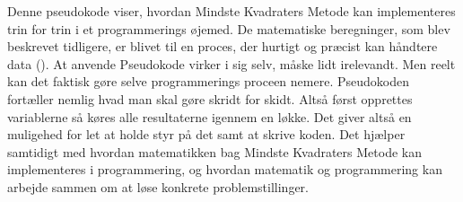 Denne pseudokode viser, hvordan Mindste Kvadraters Metode kan implementeres trin for trin i et programmerings øjemed. De matematiske beregninger, som blev beskrevet tidligere, er blivet til en proces, der hurtigt og præcist kan håndtere data (\cite{codesansar}). At anvende Pseudokode virker i sig selv, måske lidt irelevandt. Men reelt kan det faktisk gøre selve programmerings proceen nemere. Pseudokoden fortæller nemlig hvad man skal gøre skridt for skidt. Altså først opprettes variablerne så køres alle resultaterne igennem en løkke. Det giver altså en muligehed for let at holde styr på det samt at skrive koden. Det hjælper samtidigt med hvordan matematikken bag Mindste Kvadraters Metode kan implementeres i programmering, og hvordan matematik og programmering kan arbejde sammen om at løse konkrete problemstillinger.


